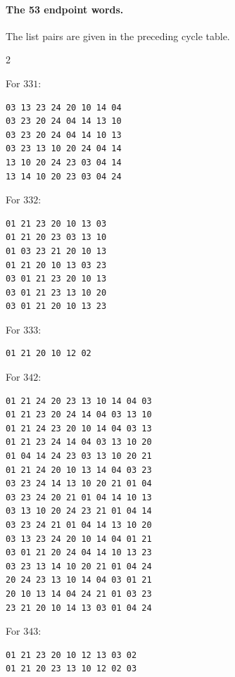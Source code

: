 \paragraph{The 53 endpoint words.}
The list pairs are given in the preceding cycle table.
\begin{multicols}{2}
\small
\noindent\begin{minipage}{\linewidth}
\noindent For $331$:
\begin{verbatim}
03 13 23 24 20 10 14 04
03 23 20 24 04 14 13 10
03 23 20 24 04 14 10 13
03 23 13 10 20 24 04 14
13 10 20 24 23 03 04 14
13 14 10 20 23 03 04 24
\end{verbatim}
\end{minipage}\par\medskip
\noindent\begin{minipage}{\linewidth}
\noindent For $332$:
\begin{verbatim}
01 21 23 20 10 13 03
01 21 20 23 03 13 10
01 03 23 21 20 10 13
01 21 20 10 13 03 23
03 01 21 23 20 10 13
03 01 21 23 13 10 20
03 01 21 20 10 13 23
\end{verbatim}
\end{minipage}\par\medskip
\noindent\begin{minipage}{\linewidth}
\noindent For $333$:
\begin{verbatim}
01 21 20 10 12 02
\end{verbatim}
\end{minipage}\par\medskip
\noindent\begin{minipage}{\linewidth}
\noindent For $342$:
\begin{verbatim}
01 21 24 20 23 13 10 14 04 03
01 21 23 20 24 14 04 03 13 10
01 21 24 23 20 10 14 04 03 13
01 21 23 24 14 04 03 13 10 20
01 04 14 24 23 03 13 10 20 21
01 21 24 20 10 13 14 04 03 23
03 23 24 14 13 10 20 21 01 04
03 23 24 20 21 01 04 14 10 13
03 13 10 20 24 23 21 01 04 14
03 23 24 21 01 04 14 13 10 20
03 13 23 24 20 10 14 04 01 21
03 01 21 20 24 04 14 10 13 23
03 23 13 14 10 20 21 01 04 24
20 24 23 13 10 14 04 03 01 21
20 10 13 14 04 24 21 01 03 23
23 21 20 10 14 13 03 01 04 24
\end{verbatim}
\end{minipage}\par\medskip
\noindent\begin{minipage}{\linewidth}
\noindent For $343$:
\begin{verbatim}
01 21 23 20 10 12 13 03 02
01 21 20 23 13 10 12 02 03

\end{verbatim}
\end{minipage}
\end{multicols}
